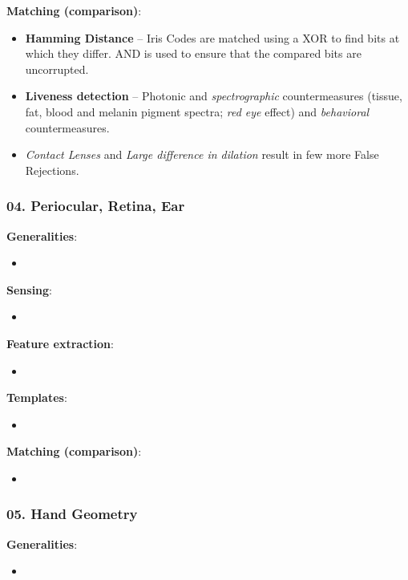 \documentclass[a4paper]{article}
\begin{document}
      \textbf{Matching (comparison)}:
      \begin{itemize}
        \item \textbf{Hamming Distance} -- Iris Codes are matched using a XOR to find bits at which they differ. AND is used to ensure that the compared bits are uncorrupted.
        \item \textbf{Liveness detection} -- Photonic and \emph{spectrographic} countermeasures (tissue, fat, blood and melanin pigment spectra; \emph{red eye} effect) and \emph{behavioral} countermeasures.
        \item \emph{Contact Lenses} and \emph{Large difference in dilation} result in few more False Rejections.
      \end{itemize}
    \subsubsection*{04. Periocular, Retina, Ear}
      \textbf{Generalities}:
      \begin{itemize}
        \item 
      \end{itemize}

      \textbf{Sensing}:
      \begin{itemize}
        \item 
      \end{itemize}

      \textbf{Feature extraction}:
      \begin{itemize}
        \item 
      \end{itemize}

      \textbf{Templates}:
      \begin{itemize}
        \item 
      \end{itemize}

      \textbf{Matching (comparison)}:
      \begin{itemize}
        \item 
      \end{itemize}
    \subsubsection*{05. Hand Geometry}
      \textbf{Generalities}:
      \begin{itemize}
        \item 
      \end{itemize}
\end{document}
